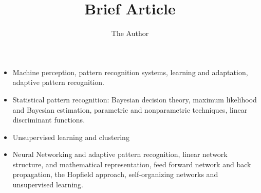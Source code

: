 \documentclass[11pt]{article}
\title{Brief Article}
\author{The Author}
\begin{document}
\maketitle

\begin{itemize}
	\item Machine perception, pattern recognition systems, learning and adaptation, adaptive pattern recognition.
	\item Statistical pattern recognition: Bayesian decision theory, maximum likelihood and Bayesian estimation, parametric and nonparametric techniques, linear discriminant functions.  
	\item Unsupervised learning and clustering
	\item Neural Networking and adaptive pattern recognition, linear network structure, and mathematical representation, feed forward network and back propagation, the Hopfield approach, self-organizing networks and unsupervised learning.  
\end{itemize}
\end{document}

